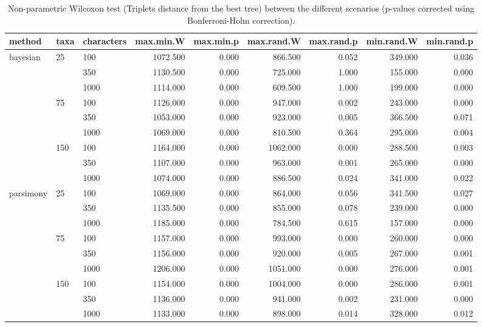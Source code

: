 \begin{table}[ht]
\centering
\begin{tabular}{lllrrrrrr}
  \hline
method & taxa & characters & max.min.W & max.min.p & max.rand.W & max.rand.p & min.rand.W & min.rand.p \\ 
  \hline
bayesian & 25 & 100 & 1072.500 & 0.000 & 866.500 & 0.052 & 349.000 & 0.036 \\ 
   &  & 350 & 1130.500 & 0.000 & 725.000 & 1.000 & 155.000 & 0.000 \\ 
   &  & 1000 & 1114.000 & 0.000 & 609.500 & 1.000 & 199.000 & 0.000 \\ 
   & 75 & 100 & 1126.000 & 0.000 & 947.000 & 0.002 & 243.000 & 0.000 \\ 
   &  & 350 & 1053.000 & 0.000 & 923.000 & 0.005 & 366.500 & 0.071 \\ 
   &  & 1000 & 1069.000 & 0.000 & 810.500 & 0.364 & 295.000 & 0.004 \\ 
   & 150 & 100 & 1164.000 & 0.000 & 1062.000 & 0.000 & 288.500 & 0.003 \\ 
   &  & 350 & 1107.000 & 0.000 & 963.000 & 0.001 & 265.000 & 0.000 \\ 
   &  & 1000 & 1074.000 & 0.000 & 886.500 & 0.024 & 341.000 & 0.022 \\ 
  parsimony & 25 & 100 & 1069.000 & 0.000 & 864.000 & 0.056 & 341.500 & 0.027 \\ 
   &  & 350 & 1135.500 & 0.000 & 855.000 & 0.078 & 239.000 & 0.000 \\ 
   &  & 1000 & 1185.000 & 0.000 & 784.500 & 0.615 & 157.000 & 0.000 \\ 
   & 75 & 100 & 1157.000 & 0.000 & 993.000 & 0.000 & 260.000 & 0.000 \\ 
   &  & 350 & 1156.000 & 0.000 & 920.000 & 0.005 & 267.000 & 0.001 \\ 
   &  & 1000 & 1206.000 & 0.000 & 1051.000 & 0.000 & 276.000 & 0.001 \\ 
   & 150 & 100 & 1154.000 & 0.000 & 1004.000 & 0.000 & 286.000 & 0.001 \\ 
   &  & 350 & 1136.000 & 0.000 & 941.000 & 0.002 & 231.000 & 0.000 \\ 
   &  & 1000 & 1133.000 & 0.000 & 898.000 & 0.014 & 328.000 & 0.012 \\ 
   \hline
\end{tabular}
\caption{Non-parametric Wilcoxon test (Triplets distance from the best tree) between the different scenarios (p-values corrected using Bonferroni-Holm correction).} 
\label{Full_Tab_BCTrbest}
\end{table}
